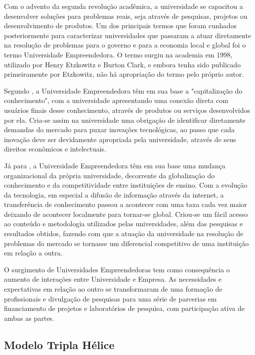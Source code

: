 Com o advento da segunda revolução acadêmica, a universidade se capacitou a desenvolver soluções para problemas reais, seja através de pesquisas, projetos ou desenvolvimento de produtos. Um dos principais termos que foram cunhados posteriormente para caracterizar universidades que passaram a atuar diretamente na resolução de problemas para o governo e para a economia local e global foi o termo Universidade Empreendedora. O termo surgiu na academia em 1998, utilizado por Henry Etzkowitz e Burton Clark, e embora tenha sido publicado primeiramente por Etzkowitz, não há apropriação do termo pelo próprio autor.

Segundo , a Universidade Empreendedora têm em sua base a "capitalização do conhecimento", com a universidade apresentando uma conexão direta com usuários finais desse conhecimento, através de produtos ou serviços desenvolvidos por ela. Cria-se assim na universidade uma obrigação de identificar diretamente demandas do mercado para puxar inovações tecnológicas, ao passo que cada inovação deve ser devidamente apropriada pela universidade, através de seus direitos econômicos e intelectuais.

Já para , a Universidade Empreendedora têm em sua base uma mudança organizacional da própria universidade, decorrente da globalização do conhecimento e da competitividade entre instituições de ensino. Com a evolução da tecnologia, em especial a difusão de informação através da internet, a transferência de conhecimento passou a acontecer com uma taxa cada vez maior deixando de acontecer localmente para tornar-se global. Criou-se um fácil acesso ao conteúdo e metodologia utilizados pelas universidades, além das pesquisas e resultados obtidos, fazendo com que a atuação da universidade na resolução de problemas do mercado se tornasse um diferencial competitivo de uma instituição em relação a outra.

O surgimento de Universidades Empreendedoras tem como consequência o aumento de interações entre Universidade e Empresa. As necessidades e expectativas em relação ao outro se transformaram de uma formação de profissionais e divulgação de pesquisas para uma série de parcerias em financiamento de projetos e laboratórios de pesquisa, com participação ativa de ambas as partes.

\subsection{Modelo Tripla Hélice}
\label{cha:univ_empreend}

